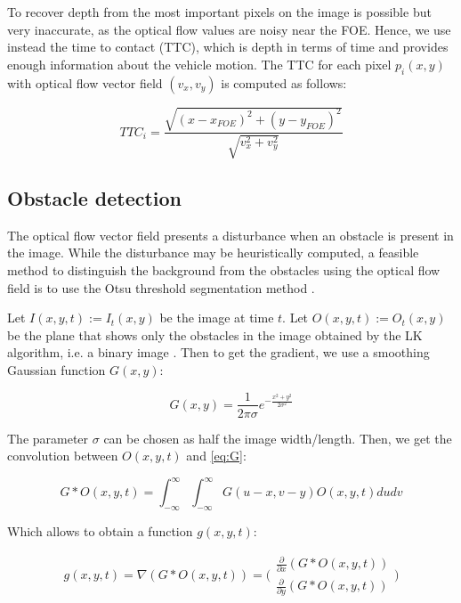 \documentclass[letterpaper, 10 pt, conference]{ieeeconf}  %
\begin{document}
To recover depth from the most important pixels on the image is possible \cite{capito2019optical} but very inaccurate, as the optical flow values are noisy near the FOE. Hence, we use instead the time to contact (TTC), which is depth in terms of time and provides enough information about the vehicle motion. The TTC for each pixel $p_i(x,y)$ with optical flow vector field $(v_x,v_y)$ is computed as follows: 

\begin{equation} \label{eq:TTC}
    TTC_i = \frac{\sqrt{(x-x_{FOE})^2+(y-y_{FOE})^2}}{\sqrt{v_x^2+v_y^2}}
\end{equation}    

\subsection{Obstacle detection}\label{sec:obs_det}

The optical flow vector field presents a disturbance when an obstacle is present in the image. While the disturbance may be heuristically computed, a feasible method to distinguish the background from the obstacles using the optical flow field is to use the Otsu threshold segmentation method \cite{otsu1979threshold}.

Let $I(x,y,t):=I_t(x,y)$ be the image at time $t$. Let $O(x,y,t):=O_t(x,y)$ be the plane that shows only the obstacles in the image obtained by the LK algorithm, i.e. a binary image \cite{ohnishi2008visual}. Then to get the gradient, we use a smoothing Gaussian function $G(x,y)$:

\begin{equation} \label{eq:G}
    G(x,y) = \frac{1}{2 \pi \sigma} e^{-\frac{x^2+y^2}{2\sigma ^2}}
\end{equation}

The parameter $\sigma$ can be chosen as half the image width/length. Then, we get the convolution between $O(x,y,t)$ and \eqref{eq:G}:

\begin{equation}
    G*O(x,y,t)= \int_{- \infty}^{\infty} \int_{- \infty}^{\infty} G(u-x,v-y)O(x,y,t)du dv
\end{equation}

Which allows to obtain a function $g(x,y,t)$:

\begin{equation} \label{eq:g}
    g(x,y,t)= \nabla(G * O(x,y,t))= \bigg( \begin{matrix} \frac{\partial}{\partial x} (G * O(x,y,t)) \\
    \frac{\partial}{\partial y} (G * O(x,y,t))
    \end{matrix} \bigg)
\end{equation}
\end{document}
